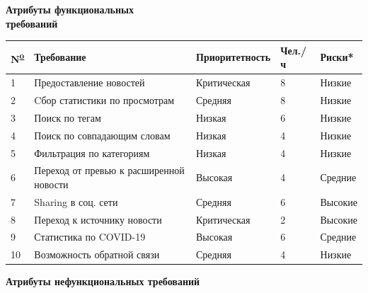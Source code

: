 \vspace{1cm}
\begin{center}
    \large
    \textbf{Атрибуты функциональных \\ требований\\}
    \small
    \begin{tabular}{|l|l|l|l|l|}
        \hline
        N\textsuperscript{\underline{o}} & Требование                              & Приоритетность & Чел./ч & Риски*  \\
        \hline
        1                                & Предоставление новостей                 & Критическая    & 8      & Низкие  \\
        \hline
        2                                & Cбор статистики по просмотрам           & Средняя        & 8      & Низкие  \\
        \hline
        3                                & Поиск по тегам                          & Низкая         & 6      & Низкие  \\
        \hline
        4                                & Поиск по совпадающим словам             & Низкая         & 4      & Низкие  \\
        \hline
        5                                & Фильтрация по категориям                & Низкая         & 4      & Низкие  \\
        \hline
        6                                & Переход от превью к расширенной новости & Высокая        & 4      & Средние \\
        \hline
        7                                & Sharing в соц. сети                     & Средняя        & 6      & Высокие \\
        \hline
        8                                & Переход к источнику новости             & Критическая    & 2      & Высокие \\
        \hline
        9                                & Статистика по COVID-19                  & Высокая        & 6      & Средние \\
        \hline
        10                               & Возможность обратной связи              & Средняя        & 4      & Низкие  \\
        \hline
    \end{tabular}
\end{center}
\newpage
\BgThispage
\large
\begin{center}
    \textbf{Атрибуты нефункциональных требований\\}
\end{center}
